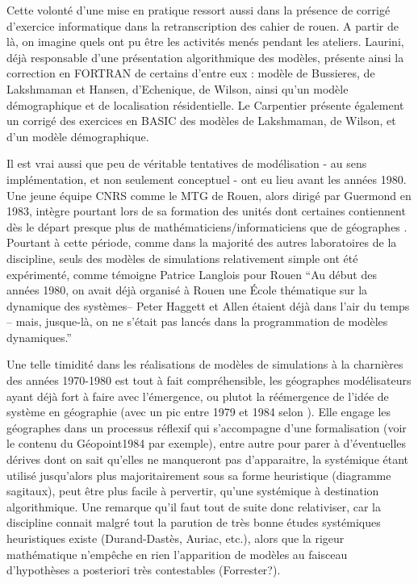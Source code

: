 Cette volonté d'une mise en pratique ressort aussi dans la présence de corrigé d'exercice informatique dans la retranscription des cahier de rouen. A partir de là, on imagine quels ont pu être les activités menés pendant les ateliers. Laurini, déjà responsable d'une présentation algorithmique des modèles, présente ainsi la correction en FORTRAN de certains d'entre eux : modèle de Bussieres, de Lakshmaman et Hansen, d'Echenique, de Wilson, ainsi qu'un modèle démographique et de localisation résidentielle. Le Carpentier présente également un corrigé des exercices en BASIC des modèles de Lakshmaman, de Wilson, et d'un modèle démographique. 

Il est vrai aussi que peu de véritable tentatives de modélisation - au sens implémentation, et non seulement conceptuel - ont eu lieu avant les années 1980. Une jeune équipe CNRS comme le MTG de Rouen, alors dirigé par Guermond en 1983, intègre pourtant lors de sa formation des unités dont certaines contiennent dès le départ presque plus de mathématiciens/informaticiens que de géographes . Pourtant à cette période, comme dans la majorité des autres laboratoires de la discipline, seuls des modèles de simulations relativement simple ont été expérimenté, comme témoigne Patrice Langlois pour Rouen \enquote{Au début des années 1980, on avait déjà organisé à Rouen une École thématique sur la dynamique des systèmes– Peter Haggett et Allen étaient déjà dans l’air du temps – mais, jusque-là, on ne s’était pas lancés dans la programmation de modèles dynamiques.} \autocite{Mathieu2014} 

Une telle timidité dans les réalisations de modèles de simulations à la charnières des années 1970-1980 est tout à fait compréhensible, les géographes modélisateurs ayant déjà fort à faire avec l'émergence, ou plutot la réémergence de l'idée de système en géographie (avec un pic entre 1979 et 1984 selon \textcite{Orain2001}). Elle engage les géographes dans un processus réflexif qui s'accompagne d'une formalisation (voir le contenu du Géopoint1984 par exemple), entre autre pour parer à d'éventuelles dérives dont on sait qu'elles ne manqueront pas d'apparaitre, la systémique étant utilisé jusqu'alors plus majoritairement sous sa forme heuristique (diagramme sagitaux), peut être plus facile à pervertir, qu'une systémique à destination algorithmique. Une remarque qu'il faut tout de suite donc relativiser, car la discipline connait malgré tout la parution de très bonne études systémiques heuristiques existe (Durand-Dastès, Auriac, etc.), alors que la rigeur mathématique n'empêche en rien l'apparition de modèles au faisceau d'hypothèses a posteriori très contestables (Forrester?). \textcite{Orain2006} %

